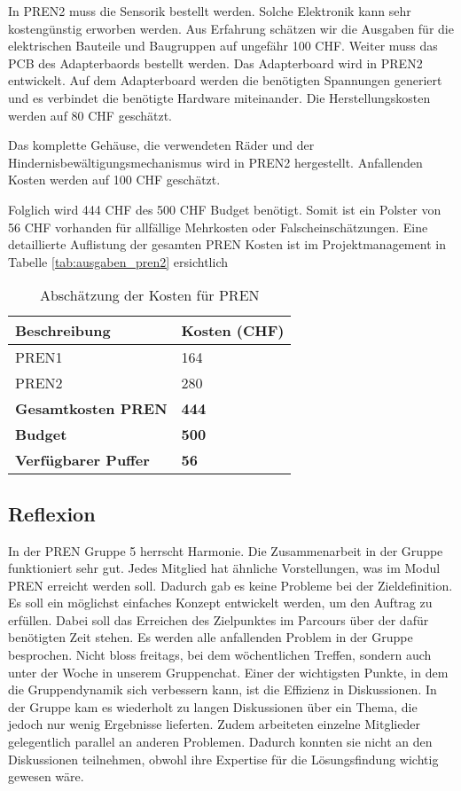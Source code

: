 \documentclass[../main.tex]{subfiles}
\begin{document}
In PREN2 muss die Sensorik bestellt werden. Solche Elektronik kann sehr kostengünstig erworben werden. Aus Erfahrung schätzen wir die Ausgaben für die elektrischen Bauteile und Baugruppen auf ungefähr 100 CHF. Weiter muss das PCB des Adapterbaords bestellt werden. Das Adapterboard wird in PREN2 entwickelt. Auf dem Adapterboard werden die benötigten Spannungen generiert und es verbindet die benötigte Hardware miteinander. Die Herstellungskosten werden auf 80 CHF geschätzt.

Das komplette Gehäuse, die verwendeten Räder und der Hindernisbewältigungsmechanismus wird in PREN2 hergestellt. Anfallenden Kosten werden auf 100 CHF geschätzt.

Folglich wird 444 CHF des 500 CHF Budget benötigt. Somit ist ein Polster von 56 CHF vorhanden für allfällige Mehrkosten oder Falscheinschätzungen. Eine detaillierte Auflistung der gesamten PREN Kosten ist im Projektmanagement in Tabelle \ref{tab:ausgaben_pren2} ersichtlich

\begin{table}[h!]
    \centering
    \begin{tabular}{|p{5cm}|p{3cm}|}
        \hline
        \textbf{Beschreibung} & \textbf{Kosten (CHF)} \\
        \hline
        PREN1 & 164 \\
        \hline
        PREN2 & 280 \\
        \hline
        \textbf{Gesamtkosten PREN} & \textbf{444} \\
        \hline
        \textbf{Budget} & \textbf{500} \\
        \hline
        \textbf{Verfügbarer Puffer} & \textbf{56} \\
        \hline
    \end{tabular}
    \caption{Abschätzung der Kosten für PREN}
    \label{tab:kostenuebersicht}
\end{table}

\subsection{Reflexion}

In der PREN Gruppe 5 herrscht Harmonie.
\newline
\newline
Die Zusammenarbeit in der Gruppe funktioniert sehr gut. Jedes Mitglied hat ähnliche Vorstellungen, was im Modul PREN erreicht werden soll. Dadurch gab es keine Probleme bei der Zieldefinition. Es soll ein möglichst einfaches Konzept entwickelt werden, um den Auftrag zu erfüllen. Dabei soll das Erreichen des Zielpunktes im Parcours über der dafür benötigten Zeit stehen. Es werden alle anfallenden Problem in der Gruppe besprochen. Nicht bloss freitags, bei dem wöchentlichen Treffen, sondern auch unter der Woche in unserem Gruppenchat. Einer der wichtigsten Punkte, in dem die Gruppendynamik sich verbessern kann, ist die Effizienz in Diskussionen. In der Gruppe kam es wiederholt zu langen Diskussionen über ein Thema, die jedoch nur wenig Ergebnisse lieferten. Zudem arbeiteten einzelne Mitglieder gelegentlich parallel an anderen Problemen. Dadurch konnten sie nicht an den Diskussionen teilnehmen, obwohl ihre Expertise für die Lösungsfindung wichtig gewesen wäre.
\end{document}
